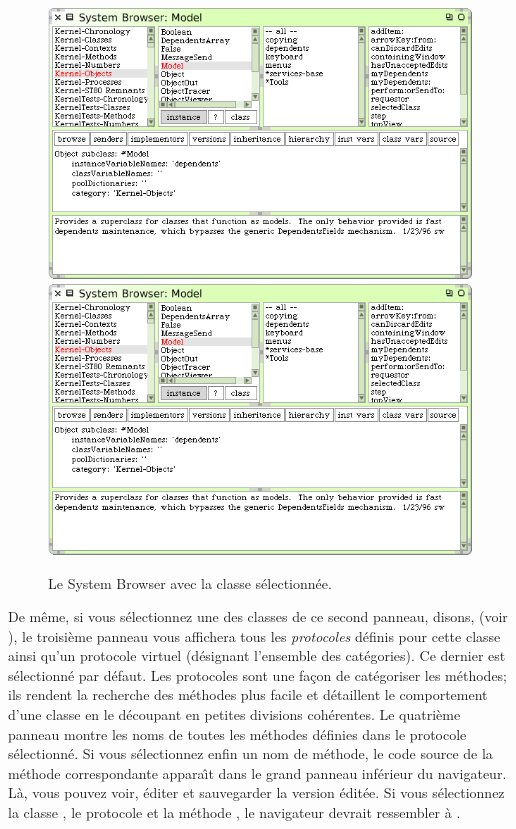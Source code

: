 \documentclass[a4paper,10pt,twoside]{book}
\begin{document}
\begin{figure}[htbp]
   \centering
   \ifluluelse
	   {\includegraphics[width=\textwidth]{SystemBrowser1} }
	   {\includegraphics[scale=.7]{SystemBrowser1} }
   \caption{Le System Browser avec la classe  s\'electionn\'ee.
   \label{fig:SystemBrowserModel}}
\end{figure}

De m\^eme, si vous s\'electionnez une des classes de ce second panneau,
disons,  (voir  ), le troisi\`eme
panneau vous affichera tous les \emph{protocoles} d\'efinis pour cette
classe ainsi qu'un protocole virtuel  (d\'esignant l'ensemble des cat\'egories). Ce dernier est s\'electionn\'e par d\'efaut. 
Les protocoles sont une fa\c{c}on de cat\'egoriser les m\'ethodes;
ils rendent la recherche des m\'ethodes plus facile et d\'etaillent
le comportement d'une classe en le d\'ecoupant en petites divisions 
coh\'erentes.
Le quatri\`eme panneau montre les noms de toutes les m\'ethodes d\'efinies dans le protocole s\'electionn\'e.
Si vous s\'electionnez enfin un nom de m\'ethode, le code source de la 
m\'ethode correspondante appara\^{\i}t dans le grand panneau inf\'erieur
du navigateur. L\`a, vous pouvez voir, \'editer et sauvegarder la version \'edit\'ee.
Si vous s\'electionnez la classe
, le protocole  et la m\'ethode , le navigateur devrait ressembler \`a .
\end{document}
